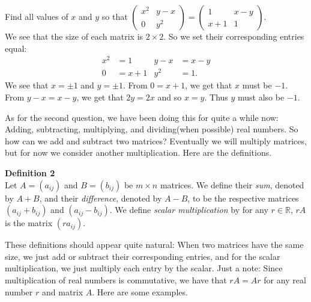 \documentclass[12pt]{article}
\def\it{\item}
\def\R{\mathbb{R}} \def\Q{\mathbb{Q}} \def\N{\mathbb{N}} \def\Z{\mathbb{Z}} \def\P{\mathbb{P}}
\begin{document}
\it Find all values of $x$ and $y$ so that $\begin{pmatrix} x^2 & y-x \\ 0 & y^2 \end{pmatrix} = \begin{pmatrix} 1 & x-y \\ x+1 & 1 \end{pmatrix}$. \\
 We see that the size of each matrix is $2 \times 2$. So we set their corresponding entries equal: 
\begin{align*}
x^2 &= 1 & y-x &= x-y \\
0 &= x+1 & y^2 &= 1.
\end{align*}
\noindent
We see that $x = \pm 1$ and $y = \pm 1$. From $0 = x + 1$, we get that $x$ must be $-1$. From $y-x = x-y$, we get that $2y = 2x$ and so $x=y$. Thus $y$ must also be $-1$. 
\ee

As for the second question, we have been doing this for quite a while now: Adding, subtracting, multiplying, and dividing(when possible) real numbers. So how can we add and subtract two matrices? Eventually we will multiply matrices, but for now we consider another multiplication. Here are the definitions.

\begin{framed}
{\bf Definition 2} \\
Let $A = (a_{ij})$ and $B = (b_{ij})$ be $m \times n$ matrices. We define their {\itshape sum}, denoted by $A + B$, and their {\itshape difference}, denoted by $A - B$, to be the respective matrices $(a_{ij} + b_{ij})$ and $(a_{ij} - b_{ij})$. We define {\itshape scalar multiplication} by for any $r \in \R$, $rA$ is the matrix $(ra_{ij})$. 
\end{framed}

These definitions should appear quite natural: When two matrices have the same size, we just add or subtract their corresponding entries, and for the scalar multiplication, we just multiply each entry by the scalar. Just a note: Since multiplication of real numbers is commutative, we have that $rA = Ar$ for any real number $r$ and matrix $A$. Here are some examples.
\end{document}
